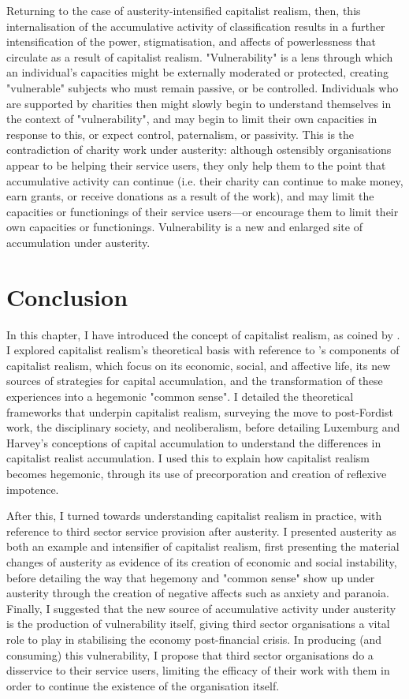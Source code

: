 Returning to the case of austerity-intensified capitalist realism, then, this internalisation of the accumulative activity of classification results in a further intensification of the power, stigmatisation, and affects of powerlessness that circulate as a result of capitalist realism. "Vulnerability" is a lens through which an individual's capacities might be externally moderated or protected, creating "vulnerable" subjects who must remain passive, or be controlled. Individuals who are supported by charities then might slowly begin to understand themselves in the context of "vulnerability", and may begin to limit their own capacities in response to this, or expect control, paternalism, or passivity. This is the contradiction of charity work under austerity: although ostensibly organisations appear to be helping their service users, they only help them to the point that accumulative activity can continue (i.e. their charity can continue to make money, earn grants, or receive donations as a result of the work), and may limit the capacities or functionings of their service users—or encourage them to limit their own capacities or functionings. Vulnerability is a new and enlarged site of accumulation under austerity.

\section{Conclusion}
In this chapter, I have introduced the concept of capitalist realism, as coined by \citet{fisher_capitalist_2009}. I explored capitalist realism's theoretical basis with reference to \citet{shonkwiler_reading_2014}'s components of capitalist realism, which focus on its economic, social, and affective life, its new sources of strategies for capital accumulation, and the transformation of these experiences into a hegemonic "common sense". I detailed the theoretical frameworks that underpin capitalist realism, surveying the move to post-Fordist work, the disciplinary society, and neoliberalism, before detailing Luxemburg and Harvey's conceptions of capital accumulation to understand the differences in capitalist realist accumulation. I used this to explain how capitalist realism becomes hegemonic, through its use of precorporation and creation of reflexive impotence. 

After this, I turned towards understanding capitalist realism in practice, with reference to third sector service provision after austerity. I presented austerity as both an example and intensifier of capitalist realism, first presenting the material changes of austerity as evidence of its creation of economic and social instability, before detailing the way that hegemony and "common sense" show up under austerity through the creation of negative affects such as anxiety and paranoia. Finally, I suggested that the new source of accumulative activity under austerity is the production of vulnerability itself, giving third sector organisations a vital role to play in stabilising the economy post-financial crisis. In producing (and consuming) this vulnerability, I propose that third sector organisations do a disservice to their service users, limiting the efficacy of their work with them in order to continue the existence of the organisation itself. 

